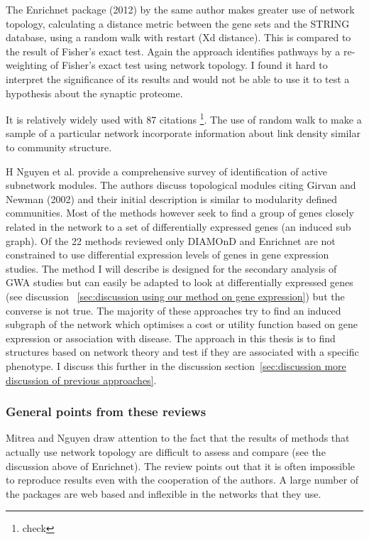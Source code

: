 The Enrichnet package (2012) by the same author \cite{glaab2012enrichnet} makes greater use of network topology, calculating a distance metric between the gene sets and the STRING database, using a random walk with restart (Xd distance). This is compared to the result of Fisher's exact test. Again the approach identifies pathways by a re-weighting of Fisher's exact test using network topology. I found it hard to interpret the significance of its results and would not be able to use it to test a hypothesis about the synaptic proteome.

It is relatively widely used with 87 citations \footnote{check}. The use of random walk to make a sample of a particular network incorporate information about link density similar to community structure. 

H Nguyen et al. \cite{nguyen2019comprehensive} provide a comprehensive survey of identification of active subnetwork modules. The authors discuss topological modules citing Girvan and Newman (2002) \cite{girvan2002community} and their initial description is similar to modularity defined communities. Most of the methods however seek to find a group of genes closely related in the network to a set of differentially expressed genes (an induced sub graph). Of the 22 methods reviewed only DIAMOnD \cite{ghiassian2015disease} and Enrichnet \cite{glaab2012enrichnet} are not constrained to use differential expression levels of genes in gene expression studies. The method I will describe is designed for the secondary analysis of GWA studies but can easily be adapted to look at differentially expressed genes (see discussion ~\ref{sec:discussion using our method on gene expression}) but the converse is not true. The majority of these approaches try to find an induced subgraph of the network which optimises a cost or utility function based on gene expression or association with disease. The approach in this thesis is to find structures based on network theory and test if they are associated with a specific phenotype. I discuss this further in the discussion section~\ref{sec:discussion more discussion of previous approaches}. 

\subsubsection{General points from these reviews}
Mitrea\cite{mitrea2013methods} and Nguyen \cite{nguyen2018network} draw attention to the fact that the results of methods that actually use network topology are difficult to assess and compare (see the discussion above of Enrichnet). The review points out that it is often impossible to reproduce results even with the cooperation of the authors. A large number of the packages are web based and inflexible in the networks that they use.
